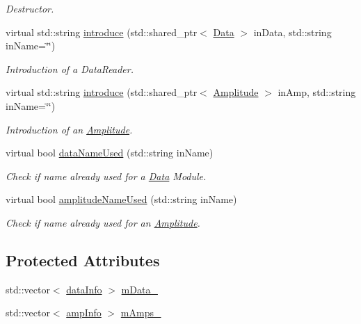 \begin{DoxyCompactItemize}
\begin{DoxyCompactList}\small\item\em Destructor. \end{DoxyCompactList}\item 
virtual std\-::string \hyperlink{class_dictionary_ad4404bf4f9e0b719de0d8ea8bbeb538d}{introduce} (std\-::shared\-\_\-ptr$<$ \hyperlink{class_data}{Data} $>$ in\-Data, std\-::string in\-Name=\char`\"{}\char`\"{})
\begin{DoxyCompactList}\small\item\em Introduction of a Data\-Reader. \end{DoxyCompactList}\item 
virtual std\-::string \hyperlink{class_dictionary_a9c6d0e700de96dd20e46f523640254b1}{introduce} (std\-::shared\-\_\-ptr$<$ \hyperlink{class_amplitude}{Amplitude} $>$ in\-Amp, std\-::string in\-Name=\char`\"{}\char`\"{})
\begin{DoxyCompactList}\small\item\em Introduction of an \hyperlink{class_amplitude}{Amplitude}. \end{DoxyCompactList}\item 
virtual bool \hyperlink{class_dictionary_a6666ce73063c5a6d3c0684361bdc30ef}{data\-Name\-Used} (std\-::string in\-Name)
\begin{DoxyCompactList}\small\item\em Check if name already used for a \hyperlink{class_data}{Data} Module. \end{DoxyCompactList}\item 
virtual bool \hyperlink{class_dictionary_aa7fea8af597aca5499aa28f30f8a0b11}{amplitude\-Name\-Used} (std\-::string in\-Name)
\begin{DoxyCompactList}\small\item\em Check if name already used for an \hyperlink{class_amplitude}{Amplitude}. \end{DoxyCompactList}\end{DoxyCompactItemize}
\subsection*{Protected Attributes}
\begin{DoxyCompactItemize}
\item 
std\-::vector$<$ \hyperlink{structdata_info}{data\-Info} $>$ \hyperlink{class_dictionary_a9025a141243715d7b87d31c0719184f8}{m\-Data\-\_\-}
\item 
std\-::vector$<$ \hyperlink{structamp_info}{amp\-Info} $>$ \hyperlink{class_dictionary_a66f7d2e3126aed512fde427b21cdc996}{m\-Amps\-\_\-}
\end{DoxyCompactItemize}



